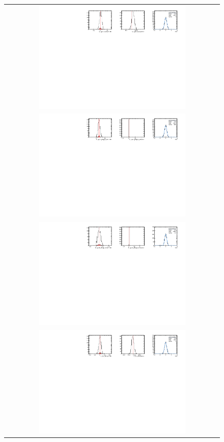 \begin{figure}
  \centering
  \begin{tabular}{c}
\includegraphics[width=0.7\textwidth]{ANA_resources/Plots/Data_fit/FitterBias//A_signal_Kpipipi.pdf} \\
\includegraphics[width=0.7\textwidth]{ANA_resources/Plots/Data_fit/FitterBias//R_signal_piKpipi_plus.pdf} \\
\includegraphics[width=0.7\textwidth]{ANA_resources/Plots/Data_fit/FitterBias//R_signal_piKpipi_minus.pdf} \\
\includegraphics[width=0.7\textwidth]{ANA_resources/Plots/Data_fit/FitterBias//A_Bs_piKpipi.pdf} \\

\end{tabular}
\end{figure}
